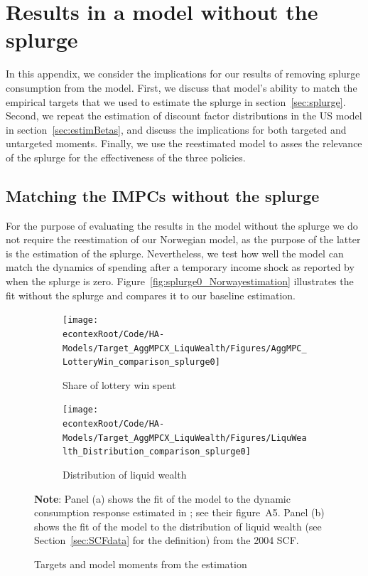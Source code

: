 \documentclass[\econtexRoot/HAFiscal]{subfiles}
\begin{document}
\hypertarget{Model_without_splurge}{}\par\section{Results in a model without the splurge}
\notinsubfile{\label{app:Model_without_splurge}}

In this appendix, we consider the implications for our results of removing splurge consumption from the model.
First, we discuss that model's ability to match the empirical targets that we used to estimate the splurge in section~\ref{sec:splurge}.
Second, we repeat the estimation of discount factor distributions in the US model in section~\ref{sec:estimBetas}, and discuss the implications for both targeted and untargeted moments.
Finally, we use the reestimated model to asses the relevance of the splurge for the effectiveness of the three policies.


\subsection{Matching the IMPCs without the splurge}

For the purpose of evaluating the results in the model without the splurge we do not require the reestimation of our Norwegian model, as the purpose of the latter is the estimation of the splurge.
Nevertheless, we test how well the model can match the dynamics of spending after a temporary income shock as reported by \citet{fagereng_mpc_2021} when the splurge is zero.
Figure~\ref{fig:splurge0_Norwayestimation} illustrates the fit without the splurge and compares it to our baseline estimation.


\begin{figure}[htb]
	\centering
	\begin{subfigure}[b]{.48\linewidth}
		\centering
		\texttt{[image: \\econtexRoot/Code/HA-Models/Target\_AggMPCX\_LiquWealth/Figures/AggMPC\_LotteryWin\_comparison\_splurge0]}
		\caption{Share of lottery win spent}
		\notinsubfile{\label{fig:aggmpclotterywin}}
	\end{subfigure}
	\begin{subfigure}[b]{.48\linewidth}
		\centering
		\texttt{[image: \\econtexRoot/Code/HA-Models/Target\_AggMPCX\_LiquWealth/Figures/LiquWealth\_Distribution\_comparison\_splurge0]}
		\caption{Distribution of liquid wealth}
		\notinsubfile{\label{fig:liquwealthdistribution}}
	\end{subfigure}%
	\caption{Targets and model moments from the estimation}
	\notinsubfile{\label{fig:splurge0_Norwayestimation}}
	\parbox{16cm}{\small \vspace{.15cm} \textbf{Note}: Panel (a) shows the fit of the model to the dynamic consumption response estimated in \citet{fagereng_mpc_2021}; see their figure~A5.
Panel (b) shows the fit of the model to the distribution of liquid wealth (see Section~\ref{sec:SCFdata} for the definition) from the 2004 SCF.\normalsize}
\end{figure}
\end{document}
